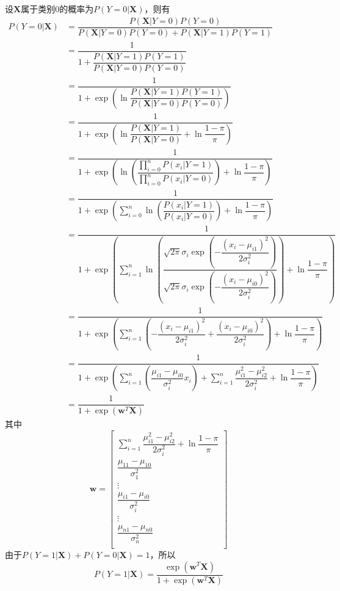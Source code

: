 设$\mathbf{X}$属于类别$0$的概率为$P(Y=0|\mathbf{X})$，则有
\begin{align}
    \label{equ1}
    P(Y=0|\mathbf{X})   &=  \dfrac{P(\mathbf{X}|Y = 0) P(Y = 0)}{P(\mathbf{X}|Y = 0) P(Y = 0) + P(\mathbf{X}|Y=1) P(Y=1)} \\
                        &=  \dfrac{1}{1+\dfrac{P(\mathbf{X}|Y=1) P(Y=1)}{P(\mathbf{X}|Y=0) P(Y=0)}} \\
                        &=  \dfrac{1}{1+\exp\left(\ln \dfrac{P(\mathbf{X}|Y=1) P(Y=1)}{P(\mathbf{X}|Y=0) P(Y=0)}\right)} \\
                        &=  \dfrac{1}{1+\exp\left(\ln \dfrac{P(\mathbf{X}|Y=1)}{P(\mathbf{X}|Y=0)} +\ln \dfrac{1 - \pi}{\pi}\right)} \\
                        &=  \dfrac{1}{1+\exp\left(\ln\left(\dfrac{\prod\limits^n_{i=0} P(x_i|Y=1)}{\prod\limits^n_{i=0} P(x_i|Y=0)}\right) +\ln \dfrac{1 - \pi}{\pi}\right)} \\
                        &=  \dfrac{1}{1+\exp\left(\sum\limits^n_{i=0}\ln\left(\dfrac{P(x_i|Y=1)}{P(x_i|Y=0)}\right) +\ln \dfrac{1 - \pi}{\pi}\right)} \\
                        &=  \dfrac{1}{1+\exp\left(\sum\limits^n_{i=1}\ln\left(\dfrac{\sqrt{2\pi}\sigma_i  \exp\left(-\dfrac{\left(x_i-\mu_{i1}\right)^2}{2\sigma^2_i}\right)}{\sqrt{2\pi}\sigma_i \exp\left(-\dfrac{\left(x_i-\mu_{i0}\right)^2}{2\sigma^2_i}\right)}\right)+\ln \dfrac{1-\pi}{\pi}\right)} \\
                        &=  \dfrac{1}{1+\exp\left(\sum\limits^n_{i=1}\left(-\dfrac{\left(x_i-\mu_{i1}\right)^2}{2\sigma^2_i}+\dfrac{\left(x_i-\mu_{i0}\right)^2}{2\sigma^2_i}\right)+\ln \dfrac{1-\pi}{\pi}\right)} \\
                        &=  \dfrac{1}{1+\exp\left(\sum\limits^n_{i=1}\left(\dfrac{\mu_{i1}-\mu_{i0}}{\sigma^2_i}x_i\right)+\sum\limits^n_{i=1}\dfrac{\mu^2_{i1}-\mu^2_{i2}}{2\sigma^2_i} +\ln\dfrac{1-\pi}{\pi}\right)} \\
                        &=  \dfrac{1}{1+\exp\left(\mathbf{w}^T\mathbf{X}\right)}
\end{align}
其中
\begin{equation}
    \mathbf{w} =
    \begin{bmatrix}
        \sum\limits^n_{i=1}\dfrac{\mu^2_{i1}-\mu^2_{i2}}{2\sigma^2_i} +\ln\dfrac{1-\pi}{\pi} \\
        \dfrac{\mu_{11}-\mu_{10}}{\sigma^2_1} \\
        \vdots \\
        \dfrac{\mu_{i1}-\mu_{i0}}{\sigma^2_i} \\
        \vdots \\
        \dfrac{\mu_{n1}-\mu_{n0}}{\sigma^2_n} \\
    \end{bmatrix}
\end{equation}
由于$P(Y=1|\mathbf{X})+P(Y=0|\mathbf{X})=1$，所以
\begin{equation}
    P(Y=1|\mathbf{X})=\dfrac{\exp\left(\mathbf{w}^T \mathbf{X}\right)}{1+\exp\left(\mathbf{w}^T \mathbf{X}\right)}
\end{equation}

